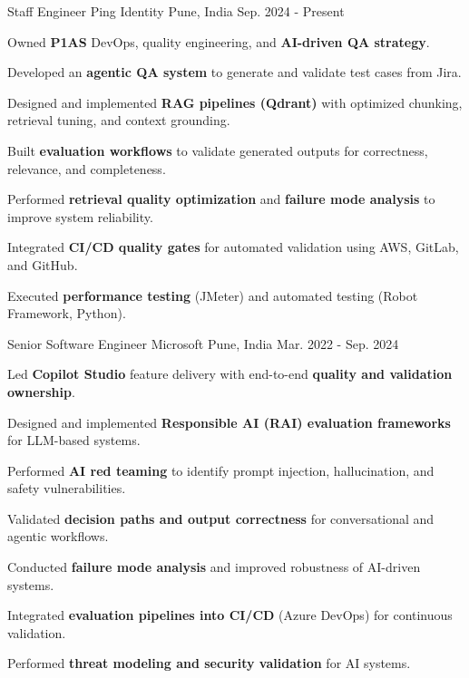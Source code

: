 

\begin{cventries}

\cventry
  {Staff Engineer}
  {Ping Identity}
  {Pune, India}
  {Sep. 2024 - Present}
  {
    \begin{cvitems}
      \item {Owned \textbf{P1AS} DevOps, quality engineering, and \textbf{AI-driven QA strategy}.}
      \item {Developed an \textbf{agentic QA system} to generate and validate test cases from Jira.}
      \item {Designed and implemented \textbf{RAG pipelines (Qdrant)} with optimized chunking, retrieval tuning, and context grounding.}
      \item {Built \textbf{evaluation workflows} to validate generated outputs for correctness, relevance, and completeness.}
      \item {Performed \textbf{retrieval quality optimization} and \textbf{failure mode analysis} to improve system reliability.}
      \item {Integrated \textbf{CI/CD quality gates} for automated validation using AWS, GitLab, and GitHub.}
      \item {Executed \textbf{performance testing} (JMeter) and automated testing (Robot Framework, Python).}
    \end{cvitems}
  }

\cventry
  {Senior Software Engineer}
  {Microsoft}
  {Pune, India}
  {Mar. 2022 - Sep. 2024}
  {
    \begin{cvitems}
      \item {Led \textbf{Copilot Studio} feature delivery with end-to-end \textbf{quality and validation ownership}.}
      \item {Designed and implemented \textbf{Responsible AI (RAI) evaluation frameworks} for LLM-based systems.}
      \item {Performed \textbf{AI red teaming} to identify prompt injection, hallucination, and safety vulnerabilities.}
      \item {Validated \textbf{decision paths and output correctness} for conversational and agentic workflows.}
      \item {Conducted \textbf{failure mode analysis} and improved robustness of AI-driven systems.}
      \item {Integrated \textbf{evaluation pipelines into CI/CD} (Azure DevOps) for continuous validation.}
      \item {Performed \textbf{threat modeling and security validation} for AI systems.}
    \end{cvitems}
  }


\end{cventries}
